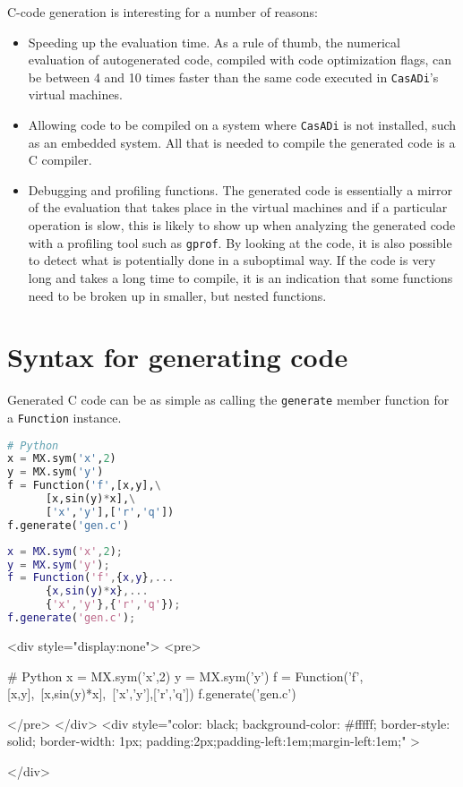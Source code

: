 \documentclass[a4paper,12pt]{book}
\newcommand{\CasADi}{\texttt{CasADi}\xspace}
\newcounter{pytexcount}
\newcounter{pytexsubcount}
\renewenvironment{pytexoutput}
{\addtocounter{pytexsubcount}{1}%
\begin{rawhtml}
<div style="display:none">
<pre>
\end{rawhtml}
}%
{\begin{rawhtml}
</pre>
</div>
<div style="color: black; background-color: \#fffff;  border-style: solid; border-width: 1px; padding:2px;padding-left:1em;margin-left:1em;" >\end{rawhtml}%
\verbatiminputeval{pytex_\alph{pytexcount}_\arabic{pytexsubcount}.log}%
\begin{rawhtml}
</div>
\end{rawhtml}
}
\begin{document}
C-code generation is interesting for a number of reasons:
\begin{itemize}
\item Speeding up the evaluation time. As a rule of thumb, the numerical evaluation of
autogenerated code, compiled with code optimization flags, can be between 4 and 10 times faster than
the same code executed in \CasADi's virtual machines.
\item Allowing code to be compiled on a system where \CasADi is not installed, such as an embedded system.
All that is needed to compile the generated code is a C compiler.
\item Debugging and profiling functions.
The generated code is essentially a mirror of the evaluation that takes place in the virtual machines and
if a particular operation is slow, this is likely to show up when analyzing the generated code with a
profiling tool such as \texttt{gprof}. By looking at the code, it is also possible to detect what is
potentially done in a suboptimal way. If the code is very long and takes a long time to compile,
it is an indication that some functions need to be broken up in smaller, but nested functions.
\end{itemize}

\section{Syntax for generating code} \label{sec:codegen_syntax}
Generated C code can be as simple as calling the \texttt{generate} member function for a \texttt{Function} instance.

\begin{minipage}[t]{0.5\textwidth}
\begin{lstlisting}[language=Python]
# Python
x = MX.sym('x',2)
y = MX.sym('y')
f = Function('f',[x,y],\
      [x,sin(y)*x],\
      ['x','y'],['r','q'])
f.generate('gen.c')
\end{lstlisting}
\end{minipage}
\begin{minipage}[t]{0.5\textwidth}
\begin{lstlisting}[language=Matlab]
% MATLAB/Octave
x = MX.sym('x',2);
y = MX.sym('y');
f = Function('f',{x,y},...
      {x,sin(y)*x},...
      {'x','y'},{'r','q'});
f.generate('gen.c');
\end{lstlisting}
\end{minipage}
\begin{pytexoutput}
# Python
x = MX.sym('x',2)
y = MX.sym('y')
f = Function('f',[x,y],\
      [x,sin(y)*x],\
      ['x','y'],['r','q'])
f.generate('gen.c')
\end{pytexoutput}
\end{document}

